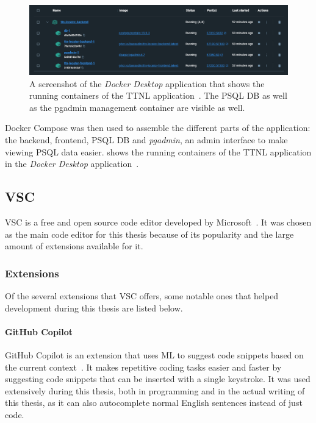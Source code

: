 \begin{figure}[htbp]
    \centering
    \includegraphics[width=1\textwidth]{pictures/ttn-locator/docker_desktop.png}
    \caption{
        A screenshot of the \emph{Docker Desktop} application that shows the running containers of the \ac{TTNL} application~\cite{docker_inc_download_2021}.
        The \acl{PSQL} \ac{DB} as well as the pgadmin management container are visible as well.
    }\label{pic:docker-desktop}
\end{figure}

Docker Compose was then used to assemble the different parts of the application: the backend, frontend, \acl{PSQL} \ac{DB} and \emph{pgadmin}, an admin interface to make viewing \acl{PSQL} data easier.
 shows the running containers of the \ac{TTNL} application in the \emph{Docker Desktop} application~\cite{docker_inc_download_2021}.

\subsection{\acf{VSC}}

\acf{VSC} is a free and open source code editor developed by Microsoft~\cite{microsoft_visual_2023}.
It was chosen as the main code editor for this thesis because of its popularity and the large amount of extensions available for it.

\subsubsection{Extensions}

Of the several extensions that \ac{VSC} offers, some notable ones that helped development during this thesis are listed below.

\paragraph{GitHub Copilot}

GitHub Copilot is an extension that uses \ac{ML} to suggest code snippets based on the current context~\cite{github_inc_github_2023}.
It makes repetitive coding tasks easier and faster by suggesting code snippets that can be inserted with a single keystroke.
It was used extensively during this thesis, both in programming and in the actual writing of this thesis, as it can also autocomplete normal English sentences instead of just code.

